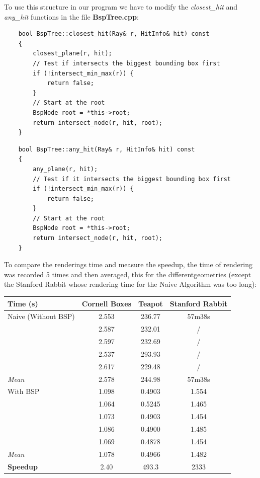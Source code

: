 \documentclass[a4,12pt]{article}
\begin{document}
	To use this structure in our program we have to modify the \textit{closest\_hit} and \textit{any\_hit} functions in the file \textbf{BspTree.cpp}:\\
	
	\begin{lstlisting}
	bool BspTree::closest_hit(Ray& r, HitInfo& hit) const
	{
		closest_plane(r, hit);
		// Test if intersects the biggest bounding box first
		if (!intersect_min_max(r)) {
			return false;
		}
		// Start at the root
		BspNode root = *this->root;
		return intersect_node(r, hit, root);
	}
	\end{lstlisting}
	
	\begin{lstlisting}
	bool BspTree::any_hit(Ray& r, HitInfo& hit) const
	{
		any_plane(r, hit);
		// Test if it intersects the biggest bounding box first
		if (!intersect_min_max(r)) {
			return false;
		}
		// Start at the root
		BspNode root = *this->root;
		return intersect_node(r, hit, root);
	}
	\end{lstlisting}
	
	To compare the renderings time and measure the speedup, the time of rendering was recorded 5 times and then averaged, this for the differentgeometries (except the Stanford Rabbit whose rendering time for the Naive Algorithm was too long):\\
	
	\begin{tabular}{|l|c|c|c|}
		\hline
		\textbf{Time (s)} & \textbf{Cornell Boxes} & \textbf{Teapot} & \textbf{Stanford Rabbit}\\ \hline \hline
		Naive (Without BSP) & 2.553 & 236.77 &57m38s\\ \hline
		& 2.587 & 232.01 &/\\ \hline
		& 2.597 & 232.69 &/\\ \hline
		& 2.537 & 293.93 &/\\ \hline
		& 2.617 & 229.48 &/\\ \hline
		\textit{Mean} & 2.578 & 244.98 &57m38s\\ \hline \hline
		With BSP & 1.098 & 0.4903 & 1.554\\ \hline
		& 1.064 & 0.5245 & 1.465\\ \hline
		& 1.073 & 0.4903 & 1.454\\ \hline
		& 1.086 & 0.4900 & 1.485\\ \hline
		& 1.069 & 0.4878 & 1.454\\ \hline
		\textit{Mean} & 1.078 & 0.4966 & 1.482\\ \hline \hline
		\textbf{Speedup} & 2.40 & 493.3 &2333\\ \hline
	\end{tabular}
	\vspace{1em}
	
\end{document}
